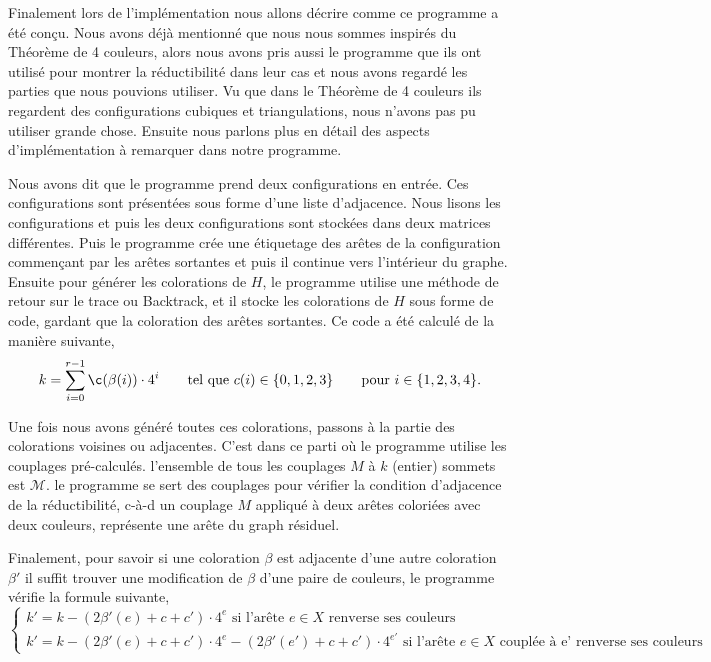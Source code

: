 \documentclass[10pt,a4paper]{article}
\begin{document}
Finalement lors de l'implémentation nous allons décrire comme ce programme a été conçu. Nous avons déjà mentionné que nous nous sommes inspirés du Théorème de 4 couleurs, alors nous avons pris aussi le programme que ils ont utilisé pour montrer la réductibilité dans leur cas et nous avons regardé les parties que nous pouvions utiliser. Vu que dans le Théorème de 4 couleurs ils regardent des configurations cubiques et triangulations, nous n'avons pas pu utiliser grande chose. Ensuite nous parlons plus en détail des aspects d'implémentation à remarquer dans notre programme.

Nous avons dit que le programme prend deux configurations en entrée. Ces configurations sont présentées sous forme d'une liste d'adjacence. Nous lisons les configurations et puis les deux configurations sont stockées dans deux matrices différentes. Puis le programme crée une étiquetage des arêtes de la configuration commençant par les arêtes sortantes et puis il continue vers l'intérieur du graphe. Ensuite pour générer les colorations de $H$, le programme utilise une méthode de retour sur le trace ou Backtrack, et il stocke les colorations de $H$ sous forme de code, gardant que la coloration des arêtes sortantes. Ce code a été calculé de la manière suivante,
$$
k = \sum_{i=0}^{r-1} \c(\beta(i)) \cdot 4^{i} \qquad \textrm{tel que   } c(i) \in \{ 0,1,2,3 \} \qquad \textrm{pour  } i \in \{1,2,3,4 \}.
$$

Une fois nous avons généré toutes ces colorations, passons à la partie des colorations voisines ou adjacentes. C'est dans ce parti où le programme utilise les couplages pré-calculés. l'ensemble de tous les couplages $M$ à $k$ (entier) sommets est $\mathcal{M}$. le programme se sert des couplages pour vérifier la condition d'adjacence de la réductibilité, c-à-d un couplage $M$ appliqué à deux arêtes coloriées avec deux couleurs, représente une arête du graph résiduel.

Finalement, pour savoir si une coloration $\beta$ est adjacente d'une autre coloration $\beta'$ il suffit trouver une modification de $\beta$ d'une paire de couleurs, le programme vérifie la formule suivante,
$$
\begin{cases}
k' =  k - (2\beta'(e)+c + c')\cdot 4^{e} \textrm{ si l'arête $e \in X$ renverse ses couleurs}\\
k' = k  - (2\beta'(e)+c + c')\cdot 4^{e} - (2\beta'(e')+c + c')\cdot 4^{e'} \textrm{ si l'arête $e \in X$ couplée à e' renverse ses couleurs}
\end{cases}
$$
\end{document}
